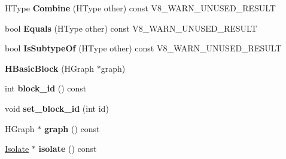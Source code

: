 \begin{DoxyCompactItemize}
\item 
\hypertarget{classv8_1_1internal_1_1_v8___f_i_n_a_l_a5898a83ef9dff26061600273f980576b}{}H\+Type {\bfseries Combine} (H\+Type other) const V8\+\_\+\+W\+A\+R\+N\+\_\+\+U\+N\+U\+S\+E\+D\+\_\+\+R\+E\+S\+U\+L\+T\label{classv8_1_1internal_1_1_v8___f_i_n_a_l_a5898a83ef9dff26061600273f980576b}

\item 
\hypertarget{classv8_1_1internal_1_1_v8___f_i_n_a_l_a36e4c20adff1e9382d01e88b9d70abc6}{}bool {\bfseries Equals} (H\+Type other) const V8\+\_\+\+W\+A\+R\+N\+\_\+\+U\+N\+U\+S\+E\+D\+\_\+\+R\+E\+S\+U\+L\+T\label{classv8_1_1internal_1_1_v8___f_i_n_a_l_a36e4c20adff1e9382d01e88b9d70abc6}

\item 
\hypertarget{classv8_1_1internal_1_1_v8___f_i_n_a_l_a84eac7d5eaf667e913c8b042d9d2c6f2}{}bool {\bfseries Is\+Subtype\+Of} (H\+Type other) const V8\+\_\+\+W\+A\+R\+N\+\_\+\+U\+N\+U\+S\+E\+D\+\_\+\+R\+E\+S\+U\+L\+T\label{classv8_1_1internal_1_1_v8___f_i_n_a_l_a84eac7d5eaf667e913c8b042d9d2c6f2}

\item 
\hypertarget{classv8_1_1internal_1_1_v8___f_i_n_a_l_a9d583c99d3f49356e56926049553fae4}{}{\bfseries H\+Basic\+Block} (H\+Graph $\ast$graph)\label{classv8_1_1internal_1_1_v8___f_i_n_a_l_a9d583c99d3f49356e56926049553fae4}

\item 
\hypertarget{classv8_1_1internal_1_1_v8___f_i_n_a_l_a3f4dfb6369e5793bdfbda2f8ab7ff0c2}{}int {\bfseries block\+\_\+id} () const \label{classv8_1_1internal_1_1_v8___f_i_n_a_l_a3f4dfb6369e5793bdfbda2f8ab7ff0c2}

\item 
\hypertarget{classv8_1_1internal_1_1_v8___f_i_n_a_l_a2da265dec657b9385eb35fa46db4556e}{}void {\bfseries set\+\_\+block\+\_\+id} (int id)\label{classv8_1_1internal_1_1_v8___f_i_n_a_l_a2da265dec657b9385eb35fa46db4556e}

\item 
\hypertarget{classv8_1_1internal_1_1_v8___f_i_n_a_l_a2fb79edeaccdc0941655150354d05f47}{}H\+Graph $\ast$ {\bfseries graph} () const \label{classv8_1_1internal_1_1_v8___f_i_n_a_l_a2fb79edeaccdc0941655150354d05f47}

\item 
\hypertarget{classv8_1_1internal_1_1_v8___f_i_n_a_l_aaf45689f05badb3d671a225e75ba5e68}{}\hyperlink{classv8_1_1internal_1_1_isolate}{Isolate} $\ast$ {\bfseries isolate} () const \label{classv8_1_1internal_1_1_v8___f_i_n_a_l_aaf45689f05badb3d671a225e75ba5e68}


\end{DoxyCompactItemize}
